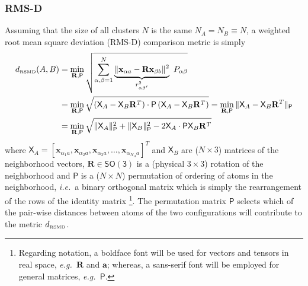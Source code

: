 \documentclass[journal=jctcce,manuscript=article]{achemso}
\newcommand{\ie}{{\it i.e.\ }}
\newcommand{\eg}{{\it e.g.\ }}
\newcommand{\ab}{\mathbf{a}}
\newcommand{\xb}{\mathbf{x}}
\newcommand{\Xs}{\mathsf{X}}
\newcommand{\Rb}{\mathbf{R}}
\newcommand{\Ps}{\mathsf{P}}
\begin{document}
\subsubsection{RMS-D}
Assuming that the size of all clusters $N$ is the same  $N_A = N_B \equiv N$,
a weighted root mean square deviation (RMS-D) comparison metric is simply
\begin{equation} \label{eq:RMSD}
\begin{split}
d_\text{\tiny{RSMD}}(A,B) 
&= \min_{\Rb,\Ps} \sqrt{ \sum_{\alpha,\beta=1}^{N} \underbrace{ \|\xb_{\alpha a} -  \Rb \xb_{\beta b} \|^2}_{r^2_{\alpha\beta'}}  \ P_{\alpha\beta}  }   \\
&= \min_{\Rb,\Ps} \sqrt{ \left( \Xs_A - \Xs_B \Rb^T \right) \cdot \Ps \left( \Xs_A - \Xs_B \Rb^T \right) }
= \min_{\Rb,\Ps} \| \Xs_A - \Xs_B \Rb^T \|_\Ps  
 \\
&= \min_{\Rb,\Ps} \sqrt{ \|\Xs_A\|^2_\Ps + \|\Xs_B\|^2_\Ps - 2 \Xs_A \cdot \Ps \Xs_B \Rb^T } 
\end{split}
\end{equation}
where $\Xs_A =[ \xb_{\alpha_1 a}, \xb_{\alpha_2 a}, \xb_{\alpha_3 a}, \ldots, \xb_{\alpha_{N_A} a} ]^T$ and $\Xs_B$ are ($N\times 3$) matrices of the neighborhood vectors,
$\Rb \in \mathsf{SO(3)}$ is a (physical $3\times 3$) rotation of the neighborhood and $\Ps$ is a ($N\times N$) permutation of ordering of atoms in the neighborhood, \ie a binary orthogonal matrix which is simply the rearrangement of the rows of the identity matrix
\footnote{Regarding notation, a boldface font will be used for vectors and tensors in real space, \eg $\Rb$ and $\ab$; whereas, a sans-serif font will be employed for general matrices, \eg $\Ps$.}.
The permutation matrix $\Ps$ selects which of the pair-wise distances between atoms of the two configurations will contribute to the metric $d_\text{\tiny{RSMD}}$.
\end{document}
